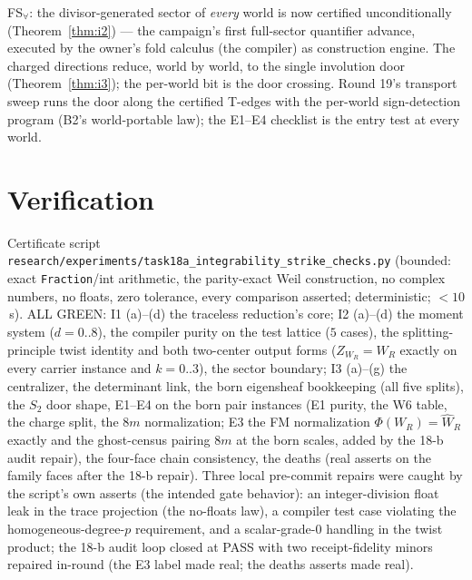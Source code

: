 \documentclass[11pt]{article}
\begin{document}
FS$_\forall$: the divisor-generated sector of \emph{every} world is now certified
unconditionally (Theorem~\ref{thm:i2}) --- the campaign's first full-sector quantifier
advance, executed by the owner's fold calculus (the compiler) as construction engine.
The charged directions reduce, world by world, to the single involution door
(Theorem~\ref{thm:i3}); the per-world bit is the door crossing. Round 19's transport
sweep runs the door along the certified T-edges with the per-world sign-detection
program (B2's world-portable law); the E1--E4 checklist is the entry test at every
world.

\section{Verification}

Certificate script \texttt{research/experiments/task18a\_integrability\_strike\_checks.py}
(bounded: exact \texttt{Fraction}/int arithmetic, the parity-exact Weil construction, no
complex numbers, no floats, zero tolerance, every comparison asserted; deterministic;
$<10$\,s). ALL GREEN: I1 (a)--(d) the traceless reduction's core; I2 (a)--(d) the moment
system ($d=0..8$), the compiler purity on the test lattice ($5$ cases), the
splitting-principle twist identity and both two-center output forms
($Z_{W_R}=W_R$ exactly on every carrier instance and $k=0..3$), the sector boundary;
I3 (a)--(g) the centralizer, the determinant link, the born eigensheaf bookkeeping
(all five splits), the $S_2$ door shape, E1--E4 on the born pair instances (E1 purity,
the W6 table, the charge split, the $8m$ normalization; E3 the FM normalization
$\Phi(W_R)=\hat W_R$ exactly and the ghost-census pairing $8m$ at the born scales,
added by the 18-b audit repair), the four-face chain consistency, the deaths (real
asserts on the family faces after the 18-b repair).
Three local pre-commit repairs were caught by the script's own asserts (the intended
gate behavior): an integer-division float leak in the trace projection (the no-floats
law), a compiler test case violating the homogeneous-degree-$p$ requirement, and a
scalar-grade-0 handling in the twist product; the 18-b audit loop closed at PASS with
two receipt-fidelity minors repaired in-round (the E3 label made real; the deaths
asserts made real).
\end{document}
